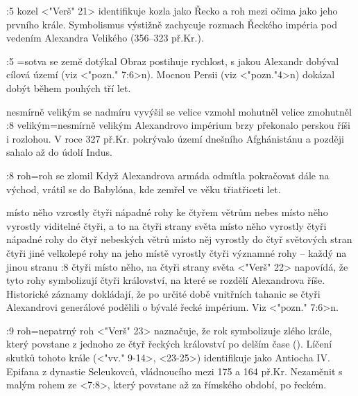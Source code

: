 :5 {kozel}  <"Verš" 21> identifikuje kozla jako Řecko a roh mezi očima jako jeho prvního krále. Symbolismus výstižně zachycuje rozmach Řeckého impéria pod vedením Alexandra Velikého (356--323 př.Kr.). 

:5 {}={sotva se země dotýkal} Obraz postihuje rychlost, s jakou Alexandr dobýval cílová území   (viz <"pozn." 7:6>n). Mocnou Persii (viz <"pozn."4>n) dokázal dobýt během pouhých tří let.

   {nesmírně velikým}   %
   {se nadmíru vyvýšil}   %
   {se velice vzmohl}   %
   {mohutněl}   %
   {velice zmohutněl}   %
:8 {velikým}={nesmírně velikým} Alexandrovo impérium brzy překonalo perskou říši i rozlohou. V roce 327 př.Kr. pokrývalo území dnešního Afghánistánu a později sahalo až do údolí Indus.

:8 {roh}={roh se zlomil}  Když Alexandrova armáda odmítla pokračovat dále na východ, vrátil se do Babylóna, kde zemřel ve věku třiatřiceti let. 

   {místo něho vzrostly čtyři nápadné rohy ke čtyřem větrům nebes}   %
   {místo něho vyrostly viditelné čtyři, a to na čtyři strany světa}   %
   {místo něho vyrostly čtyři nápadné rohy do čtyř nebeských větrů}   %
   {místo něj vyrostly do čtyř světových stran čtyři jiné velkolepé rohy}   %
   {na jeho místě vyrostly čtyři významné rohy -- každý na jinou stranu}   %
:8 {čtyři místo něho, na čtyři strany světa}  <"Verš" 22> napovídá, že tyto rohy symbolizují čtyři království, na které se rozdělí Alexandrova říše. Historické záznamy dokládají, že po určité době vnitřních tahanic  se čtyři Alexandrovi generálové podělili o bývalé řecké impérium. Viz <"pozn." 7:6>n.

:9 {roh}={nepatrný roh}  <"Verš" 23> naznačuje, že rok symbolizuje zlého krále, který povstane z jednoho ze čtyř řeckých království po delším čase (). 
Líčení skutků tohoto krále (<"vv." 9-14>, <23-25>) identifikuje jako Antiocha IV. Epifana z dynastie
Seleukovců, vládnoucího mezi 175 a 164 př.Kr. Nezaměnit s malým rohem ze <7:8>, který povstane až za římského období, po řeckém. 

